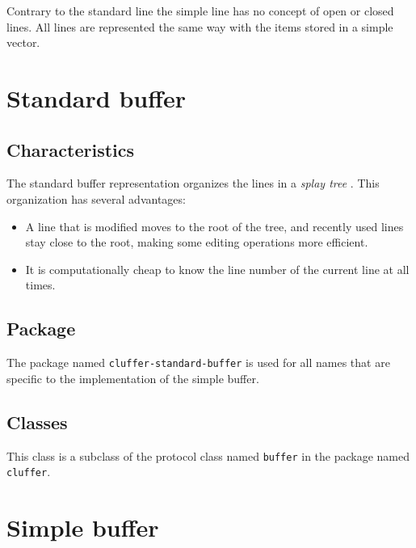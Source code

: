 Contrary to the standard line
 the simple line has no
concept of open or closed lines.  All lines are represented the same
way with the items stored in a simple \commonlisp{} vector.

\section{Standard buffer}
\label{sec-implementation-standard-buffer}

\subsection{Characteristics}

The standard buffer representation organizes the lines in a
\emph{splay tree} \cite{Sleator:1985:SBS:3828.3835}.  This
organization has several advantages:

\begin{itemize}
\item A line that is modified moves to the root of the tree, and
  recently used lines stay close to the root, making some editing
  operations more efficient.
\item It is computationally cheap to know the line number of the
  current line at all times.
\end{itemize}

\subsection{Package}

The package named \texttt{cluffer-standard-buffer} is used for all
names that are specific to the implementation of the simple buffer.

\subsection{Classes}


This class is a subclass of the protocol class named \texttt{buffer} in
the package named \texttt{cluffer}.

\section{Simple buffer}
\label{sec-implementation-simple-buffer}
